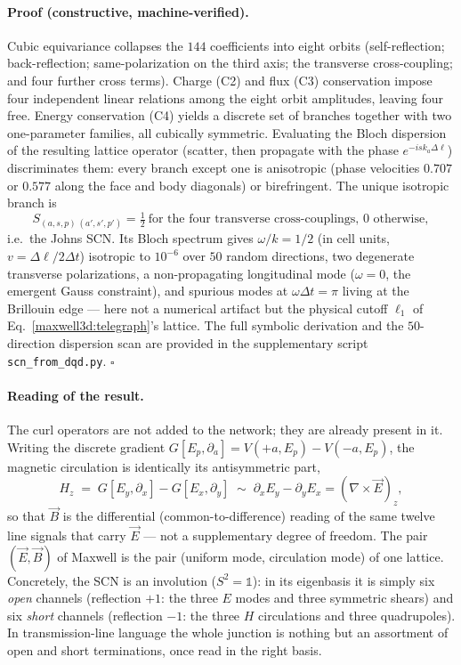 \documentclass[11pt,a4paper]{article}
\theoremstyle{plain}
\theoremstyle{remark}
\begin{document}
\paragraph{Proof (constructive, machine-verified).} Cubic equivariance collapses the $144$ coefficients into eight orbits (self-reflection; back-reflection; same-polarization on the third axis; the transverse cross-coupling; and four further cross terms). Charge (C2) and flux (C3) conservation impose four independent linear relations among the eight orbit amplitudes, leaving four free. Energy conservation (C4) yields a discrete set of branches together with two one-parameter families, all cubically symmetric. Evaluating the Bloch dispersion of the resulting lattice operator (scatter, then propagate with the phase $e^{-i s k_a \Delta\ell}$) discriminates them: every branch except one is anisotropic (phase velocities $0.707$ or $0.577$ along the face and body diagonals) or birefringent. The unique isotropic branch is
\begin{equation}\label{maxwell3d:scn}
S_{(a,s,p)\,(a',s',p')} = \tfrac12\ \text{for the four transverse cross-couplings, } 0 \text{ otherwise},
\end{equation}
i.e.\ the Johns SCN. Its Bloch spectrum gives $\omega/k = 1/2$ (in cell units, $v=\Delta\ell/2\Delta t$) isotropic to $10^{-6}$ over $50$ random directions, two degenerate transverse polarizations, a non-propagating longitudinal mode ($\omega=0$, the emergent Gauss constraint), and spurious modes at $\omega\Delta t = \pi$ living at the Brillouin edge --- here not a numerical artifact but the physical cutoff $\ell_1$ of Eq.~\eqref{maxwell3d:telegraph}'s lattice. The full symbolic derivation and the $50$-direction dispersion scan are provided in the supplementary script \texttt{scn\_from\_dqd.py}. $\square$

\paragraph{Reading of the result.} The curl operators are not added to the network; they are already present in it. Writing the discrete gradient $G[E_p,\partial_a] = V(+a,E_p) - V(-a,E_p)$, the magnetic circulation is identically its antisymmetric part,
\begin{equation}\label{maxwell3d:curl}
H_z \;=\; G[E_y,\partial_x] - G[E_x,\partial_y] \;\sim\; \partial_x E_y - \partial_y E_x = (\nabla\times\vec E)_z,
\end{equation}
so that $\vec B$ is the differential (common-to-difference) reading of the same twelve line signals that carry $\vec E$ --- not a supplementary degree of freedom. The pair $(\vec E,\vec B)$ of Maxwell is the pair (uniform mode, circulation mode) of one lattice. Concretely, the SCN is an involution ($S^2=\mathbb1$): in its eigenbasis it is simply six \emph{open} channels (reflection $+1$: the three $E$ modes and three symmetric shears) and six \emph{short} channels (reflection $-1$: the three $H$ circulations and three quadrupoles). In transmission-line language the whole junction is nothing but an assortment of open and short terminations, once read in the right basis.
\end{document}
